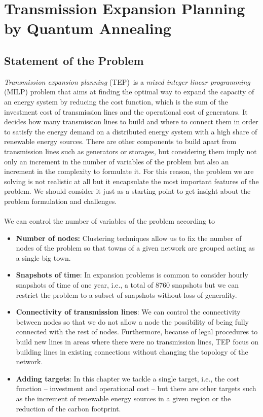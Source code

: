 \chapter{Transmission Expansion Planning by Quantum Annealing} %
\label{Chapter4} %
\section{Statement of the Problem}
\textit{Transmission expansion planning} (TEP)\,\cite{Neumann2020TransmissionFlows} is a \textit{mixed integer linear programming} (MILP) problem that aims at finding the optimal way to expand the capacity of an energy system by reducing the cost function, which is the sum of the investment cost of transmission lines and the operational cost of generators. It decides how many transmission lines to build and where to connect them in order to satisfy the energy demand on a distributed energy system with a high share of renewable energy sources. There are other components to build apart from transmission lines such as generators or storages, but considering them imply not only an increment in the number of variables of the problem but also an increment in the complexity to formulate it. For this reason, the problem we are solving is not realistic at all but it encapsulate the most important features of the problem. We should consider it just as a starting point to get insight about the problem formulation and challenges.\\\\
We can control the number of variables of the problem according to
\begin{itemize}
    \item \textbf{Number of nodes:} Clustering techniques allow us to fix the number of nodes of the problem so that towns of a given network are grouped acting as a single big town.
    \item \textbf{Snapshots of time}: In expansion problems is common to consider hourly snapshots of time of one year, i.e., a total of 8760 snapshots but we can restrict the problem to a subset of snapshots without loss of generality.
    \item \textbf{Connectivity of transmission lines}: We can control the connectivity between nodes so that we do not allow a node the possibility of being fully connected with the rest of nodes. Furthermore, because of legal procedures to build new lines in areas where there were no transmission lines, TEP focus on building lines in existing connections without changing the topology of the network.
    \item \textbf{Adding targets}: In this chapter we tackle a single target, i.e., the cost function -- investment and operational cost -- but there are other targets such as the increment of renewable energy sources in a given region or the reduction of the carbon footprint.
\end{itemize}
